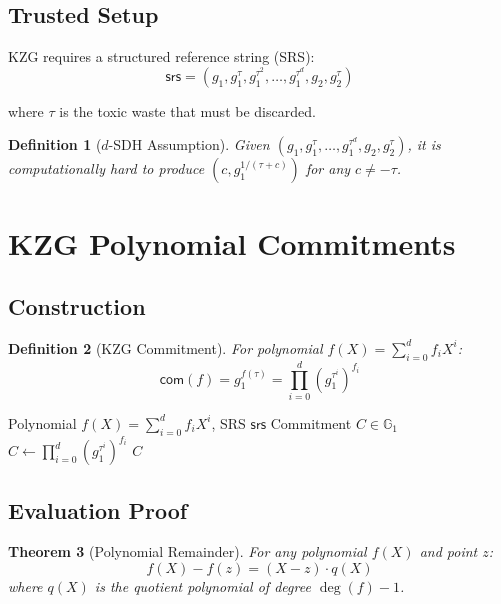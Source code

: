\documentclass[11pt,a4paper]{article}
\newtheorem{theorem}{Theorem}[section]
\newtheorem{definition}[theorem]{Definition}
\newcommand{\G}{\mathbb{G}}
\newcommand{\com}{\mathsf{com}}
\begin{document}
\subsection{Trusted Setup}

KZG requires a structured reference string (SRS):
\[
\mathsf{srs} = (g_1, g_1^\tau, g_1^{\tau^2}, \ldots, g_1^{\tau^d}, g_2, g_2^\tau)
\]

where $\tau$ is the toxic waste that must be discarded.

\begin{definition}[$d$-SDH Assumption]
Given $(g_1, g_1^\tau, \ldots, g_1^{\tau^d}, g_2, g_2^\tau)$, it is computationally hard to produce $(c, g_1^{1/(\tau + c)})$ for any $c \neq -\tau$.
\end{definition}

\section{KZG Polynomial Commitments}
\label{sec:kzg}

\subsection{Construction}

\begin{definition}[KZG Commitment]
For polynomial $f(X) = \sum_{i=0}^d f_i X^i$:
\[
\com(f) = g_1^{f(\tau)} = \prod_{i=0}^d (g_1^{\tau^i})^{f_i}
\]
\end{definition}

\begin{algorithm}
\caption{KZG Commitment}
\label{alg:kzg-commit}
\begin{algorithmic}[1]
\Require Polynomial $f(X) = \sum_{i=0}^d f_i X^i$, SRS $\mathsf{srs}$
\Ensure Commitment $C \in \G_1$
\State $C \gets \prod_{i=0}^d (g_1^{\tau^i})^{f_i}$ 
\State \Return $C$
\end{algorithmic}
\end{algorithm}

\subsection{Evaluation Proof}

\begin{theorem}[Polynomial Remainder]
For any polynomial $f(X)$ and point $z$:
\[
f(X) - f(z) = (X - z) \cdot q(X)
\]
where $q(X)$ is the quotient polynomial of degree $\deg(f) - 1$.
\end{theorem}
\end{document}
